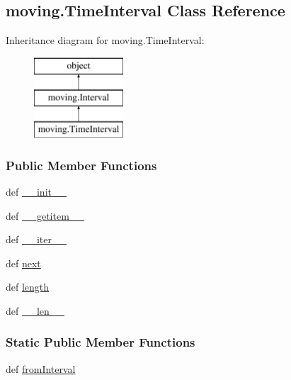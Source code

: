 \hypertarget{classmoving_1_1TimeInterval}{\subsection{moving.\-Time\-Interval Class Reference}
\label{classmoving_1_1TimeInterval}
}
Inheritance diagram for moving.\-Time\-Interval\-:\begin{figure}[H]
\begin{center}
\leavevmode
\includegraphics[height=3.000000cm]{classmoving_1_1TimeInterval}
\end{center}
\end{figure}
\subsubsection*{Public Member Functions}
\begin{DoxyCompactItemize}
\item 
def \hyperlink{classmoving_1_1TimeInterval_a7af29afa5399e6a89979b2d7930ad14f}{\-\_\-\-\_\-init\-\_\-\-\_\-}
\item 
def \hyperlink{classmoving_1_1TimeInterval_a590e1112c0dd6d7c8ea1e272ea9beb2b}{\-\_\-\-\_\-getitem\-\_\-\-\_\-}
\item 
def \hyperlink{classmoving_1_1TimeInterval_aaab23297bd9a0ff513f88966e1231644}{\-\_\-\-\_\-iter\-\_\-\-\_\-}
\item 
def \hyperlink{classmoving_1_1TimeInterval_a56e0c258fbbc298b6ac90cb1db82512a}{next}
\item 
def \hyperlink{classmoving_1_1TimeInterval_a1b4d7bd8465295aca88c0ad5c8dda623}{length}
\item 
def \hyperlink{classmoving_1_1TimeInterval_acc6396f77729b23eb22886a2b7f5d8b8}{\-\_\-\-\_\-len\-\_\-\-\_\-}
\end{DoxyCompactItemize}
\subsubsection*{Static Public Member Functions}
\begin{DoxyCompactItemize}
\item 
def \hyperlink{classmoving_1_1TimeInterval_a774e1d275ffd45d4f4d639db595467a6}{from\-Interval}
\end{DoxyCompactItemize}
